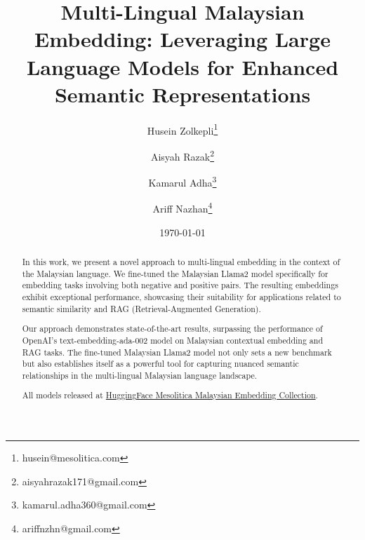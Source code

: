 \documentclass{article}
\title{Multi-Lingual Malaysian Embedding: Leveraging Large Language Models for Enhanced Semantic Representations}
\author{
  Husein Zolkepli\thanks{husein@mesolitica.com} \and 
  Aisyah Razak\thanks{aisyahrazak171@gmail.com} \and
  Kamarul Adha\thanks{kamarul.adha360@gmail.com} \and
  Ariff Nazhan\thanks{ariffnzhn@gmail.com}
}
\date{\today}
\begin{document}
\maketitle

\begin{abstract}
    In this work, we present a novel approach to multi-lingual embedding in the context of the Malaysian language. We fine-tuned the Malaysian Llama2 model specifically for embedding tasks involving both negative and positive pairs. The resulting embeddings exhibit exceptional performance, showcasing their suitability for applications related to semantic similarity and RAG (Retrieval-Augmented Generation).

    Our approach demonstrates state-of-the-art results, surpassing the performance of OpenAI's text-embedding-ada-002 model on Malaysian contextual embedding and RAG tasks. The fine-tuned Malaysian Llama2 model not only sets a new benchmark but also establishes itself as a powerful tool for capturing nuanced semantic relationships in the multi-lingual Malaysian language landscape.

    All models released at \href{https://huggingface.co/collections/mesolitica/malaysian-embedding-6523612bfe5881ad35f81b99}{HuggingFace Mesolitica Malaysian Embedding Collection}.

\end{abstract}
\end{document}
